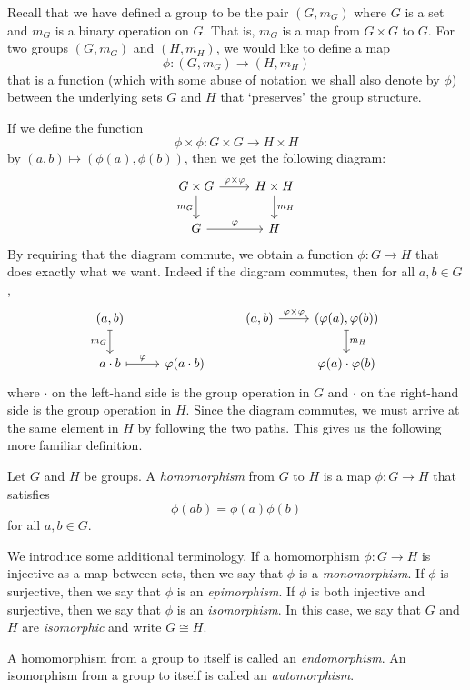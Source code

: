 \begin{sectionthm}
    Recall that we have defined a group to be the pair \((G, m_G)\) where \(G\) is a set and \(m_G\) is a binary operation on \(G\). That is, \(m_G\) is a map from \(G \times G\) to \(G\). For two groups \((G, m_G)\) and \((H, m_H)\), we would like to define a map
    \[
        \phi: (G, m_G) \to (H, m_H)
    \]
    that is a function (which with some abuse of notation we shall also denote by \(\phi\)) between the underlying sets \(G\) and \(H\) that `preserves' the group structure.

    If we define the function
    \[
        \phi \times \phi: G \times G \to H \times H
    \]
    by \((a, b) \mapsto (\phi(a), \phi(b))\), then we get the following diagram:
    \[
        \begin{tikzcd}
            G \times G \arrow{r}{\phi \times \phi} \arrow[swap]{d}{m_G} & H \times H \arrow{d}{m_H} \\
            G \arrow{r}{\phi} & H
        \end{tikzcd}
    \]
    By requiring that the diagram commute, we obtain a function \(\phi: G \to H\) that does exactly what we want. Indeed if the diagram commutes, then for all \(a, b \in G\),
    \[
        \begin{tikzcd}
            (a, b) \arrow[swap, mapsto]{d}{m_G} & & (a, b) \arrow{r}{\phi \times \phi} & (\phi(a), \phi(b)) \arrow[mapsto]{d}{m_H} \\
            a\cdot b \arrow[mapsto]{r}{\phi} & \phi(a\cdot b) && \phi(a)\cdot\phi(b)
        \end{tikzcd}
    \]
    where \(\cdot\) on the left-hand side is the group operation in \(G\) and \(\cdot\) on the right-hand side is the group operation in \(H\). Since the diagram commutes, we must arrive at the same element in \(H\) by following the two paths. This gives us the following more familiar definition.
\end{sectionthm}

\begin{definition}
    Let \(G\) and \(H\) be groups. A \emph{homomorphism} from \(G\) to \(H\) is a map \(\phi: G \to H\) that satisfies
    \[
        \phi(ab) = \phi(a)\phi(b)
    \]
    for all \(a, b \in G\).

    We introduce some additional terminology. If a homomorphism \(\phi: G \to H\) is injective as a map between sets, then we say that \(\phi\) is a \emph{monomorphism}. If \(\phi\) is surjective, then we say that \(\phi\) is an \emph{epimorphism}. If \(\phi\) is both injective and surjective, then we say that \(\phi\) is an \emph{isomorphism}. In this case, we say that \(G\) and \(H\) are \emph{isomorphic} and write \(G \cong H\).

    A homomorphism from a group to itself is called an \emph{endomorphism}. An isomorphism from a group to itself is called an \emph{automorphism}.
\end{definition}

